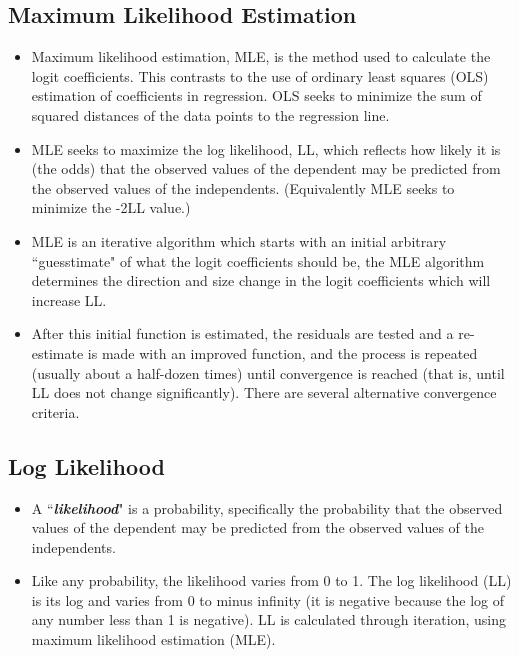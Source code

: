 \documentclass[a4paper,12pt]{article}
\begin{document}
\subsection*{Maximum Likelihood Estimation}
\begin{itemize}
	\item Maximum likelihood estimation, MLE, is the method used to calculate the logit coefficients. This contrasts to the use of ordinary least squares (OLS) estimation of coefficients in regression. OLS seeks to minimize the sum of squared distances of the data points to the regression line. 
	\item MLE seeks to maximize the log likelihood, LL, which reflects how likely it is (the odds) that the observed values of the dependent may be predicted from the observed values of the independents. (Equivalently MLE seeks to minimize the -2LL value.)
	
\item 	MLE is an iterative algorithm which starts with an initial arbitrary ``guesstimate" of what the logit coefficients should be, the MLE algorithm determines the direction and size change in the logit coefficients which will increase LL.
\item  After this initial function is estimated, the residuals are tested and a re-estimate is made with an improved function, and the process is repeated (usually about a half-dozen times) until convergence is reached (that is, until LL does not change significantly). There are several alternative convergence criteria.
\end{itemize}



\subsection*{Log Likelihood}
\begin{itemize}
	\item A ``\textbf{\textit{likelihood}}" is a probability, specifically the probability that the observed values of the dependent may be predicted from the observed values of the independents. 

\item Like any probability, the likelihood varies from 0 to 1. The log likelihood (LL) is its log and varies from 0 to minus infinity (it is negative because the log of any number less than 1 is negative). LL is calculated through iteration, using maximum likelihood estimation (MLE).
\end{itemize}
\end{document}
